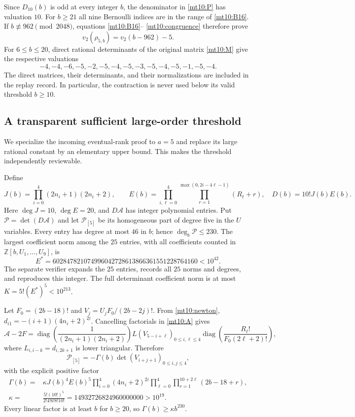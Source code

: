 Since $D_{10}(b)$ is odd at every integer $b$, the denominator in
\eqref{mt10:P} has valuation $10$. For $b\ge21$ all nine Bernoulli
indices are in the range of \eqref{mt10:B16}. If
$b\not\equiv962\pmod {2048}$, equations \eqref{mt10:B16}--
\eqref{mt10:congruence} therefore prove
\begin{equation}\label{mt10:valuation}
                 v_2(\rho_{5,b})=v_2(b-962)-5.
\end{equation}
For $6\le b\le20$, direct rational determinants of the original
matrix \eqref{mt10:M} give the respective valuations
\[
 -4,-4,-6,-5,-2,-5,-4,-5,-3,-5,-4,-5,-1,-5,-4.
\]
The direct matrices, their determinants, and their normalizations are
included in the replay record. In particular, the contraction is never
used below its valid threshold $b\ge10$.

\subsection{A transparent sufficient large-order threshold}

We specialize the incoming eventual-rank proof to $a=5$ and replace
its large rational constant by an elementary upper bound. This makes
the threshold independently reviewable.

Define
\[
 J(b)=\prod_{i=0}^4(2n_i+1)(2n_i+2),\qquad
 E(b)=\prod_{i,\ell=0}^4
             \prod_{r=1}^{\max(0,2i-4\ell-1)}(R_\ell+r),
 \quad D(b)=10!J(b)E(b).
\]
Here $\deg J=10$, $\deg E=20$, and $D\mathcal A$ has integer
polynomial entries. Put $\mathscr P=\det(D\mathcal A)$ and let
$\mathscr P_{[5]}$ be its homogeneous part of degree five in the
$U$ variables. Every entry has degree at most $46$ in $b$; hence
$\deg_b\mathscr P\le230$. The largest coefficient norm among the
$25$ entries, with all coefficients counted in
$\mathbb Z[b,U_1,\ldots,U_9]$, is
\[
 E^*=602847821074996042728613866361551228764160<10^{42}.
\]
The separate verifier expands the $25$ entries, records all $25$
norms and degrees, and reproduces this integer. The full determinant
coefficient norm is at most $K=5!(E^*)^5<10^{213}$.

Let $F_0=(2b-18)!$ and $V_j=U_jF_0/(2b-2j)!$. From
\eqref{mt10:newton},
$d_{i1}=-(i+1)(4n_i+2)^{\underline{2i}}$. Cancelling factorials
in \eqref{mt10:A} gives
\[
 \mathcal A-2F=
 \operatorname{diag}\left(\frac1{(2n_i+1)(2n_i+2)}\right)
 L(V_{5-i+\ell})_{0\le i,\ell\le4}
 \operatorname{diag}\left(\frac{R_\ell!}{F_0(2\ell+2)!}\right),
\]
where $L_{i,i-k}=d_{i,2k+1}$ is lower triangular. Therefore
\[
 \mathscr P_{[5]}=-\Gamma(b)\det(V_{i+j+1})_{0\le i,j\le4},
\]
with the explicit positive factor
\begin{align*}
 \Gamma(b)={}&\kappa J(b)^4E(b)^5
 \prod_{i=0}^4(4n_i+2)^{\underline{2i}}
 \prod_{\ell=0}^4\prod_{r=1}^{10+2\ell}(2b-18+r),\\
 \kappa={}&\frac{5!(10!)^5}{2!4!6!8!10!}
          =14932726824960000000>10^{19}.
\end{align*}
Every linear factor is at least $b$ for $b\ge20$, so
$\Gamma(b)\ge\kappa b^{230}$.

